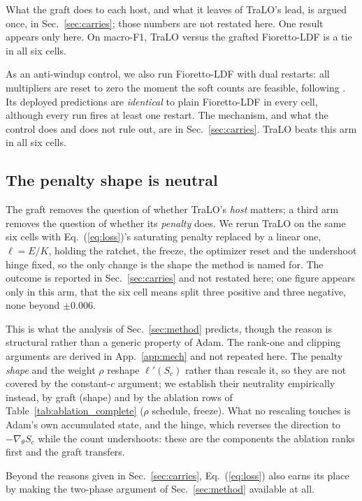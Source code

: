 \documentclass[10pt]{article}
\begin{document}
{}{What the graft does to each host,
and what it leaves of TraLO's lead, is argued once, in Sec.~\ref{sec:carries};
those numbers are not restated here. One result appears only here.}
On macro-F1, TraLO versus the grafted
Fioretto-LDF is a tie in all six cells.

As an anti-windup control, we also run Fioretto-LDF with dual restarts:
all multipliers are reset to zero the moment the soft counts are
feasible, following \citet{gallego2022controlled}. Its deployed
predictions are \emph{identical} to plain Fioretto-LDF in every cell,
although every run fires at least one restart. %
{The mechanism, and what the control does and does not rule out,
are in Sec.~\ref{sec:carries}.}
TraLO beats this arm in all six cells. 

\subsection{The penalty shape is neutral}
\label{app:shape}


The graft removes the question of whether TraLO's \emph{host} matters; a
third arm removes the question of whether its \emph{penalty} does. We
rerun TraLO on the same six cells with Eq.~(\ref{eq:loss})'s saturating
penalty replaced by a linear one, $\ell = E/K$, holding the ratchet, the
freeze, the optimizer reset and the undershoot hinge fixed, so the only
change is the shape the method is named for. %
{The outcome is reported in Sec.~\ref{sec:carries} and not
restated here; one figure appears only in this arm, that the six cell means
split three positive and three negative, none beyond $\pm0.006$.}

This is what the analysis of Sec.~\ref{sec:method} predicts, though the
reason is structural rather than a generic property of Adam. %
{The rank-one and clipping arguments are derived in
App.~\ref{app:mech} and not repeated here.}
The penalty \emph{shape} and the weight $\rho$ reshape $\ell'(S_c)$
rather than rescale it, so they are not covered by the constant-$c$
argument; we establish their neutrality empirically instead, by graft
(shape) and by the ablation rows of Table~\ref{tab:ablation_complete}
($\rho$ schedule, freeze). What no rescaling touches is Adam's own
accumulated state, and the hinge, which reverses the direction to
$-\nabla_\theta S_c$ while the count undershoots: these are the
components the ablation ranks first and the graft transfers.

{Beyond the reasons given in
Sec.~\ref{sec:carries}, Eq.~(\ref{eq:loss}) also earns its place by making} the two-phase argument of Sec.~\ref{sec:method}
available at all.
\end{document}
